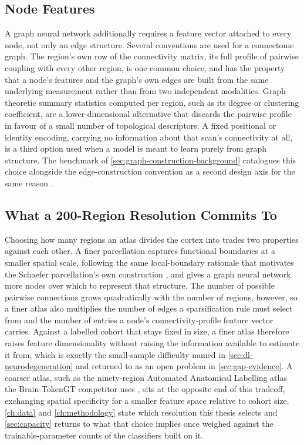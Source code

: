 \subsection{Node Features}\label{sec:node-features-background}

A graph neural network additionally requires a feature vector attached to every node, not
only an edge structure. Several conventions are used for a connectome graph. The
region's own row of the connectivity matrix, its full profile of pairwise coupling with
every other region, is one common choice, and has the property that a node's features and
the graph's own edges are built from the same underlying measurement rather than from two
independent modalities. Graph-theoretic summary statistics computed per region, such as
its degree or clustering coefficient, are a lower-dimensional alternative that discards the
pairwise profile in favour of a small number of topological descriptors. A fixed positional
or identity encoding, carrying no information about that scan's connectivity at all, is a
third option used when a model is meant to learn purely from graph structure. The
benchmark of \autoref{sec:graph-construction-background} catalogues this choice alongside
the edge-construction convention as a second design axis for the same reason
\parencite{cui2023braingb}.

\subsection{What a 200-Region Resolution Commits To}\label{sec:resolution-tradeoff}

Choosing how many regions an atlas divides the cortex into trades two properties against
each other. A finer parcellation captures functional boundaries at a smaller spatial scale,
following the same local-boundary rationale that motivates the Schaefer parcellation's own
construction \parencite{schaefer2018parcellation}, and gives a graph neural network more
nodes over which to represent that structure. The number of possible pairwise connections
grows quadratically with the number of regions, however, so a finer atlas also multiplies
the number of edges a sparsification rule must select from and the number of entries a
node's connectivity-profile feature vector carries. Against a labelled cohort that stays
fixed in size, a finer atlas therefore raises feature dimensionality without raising the
information available to estimate it from, which is exactly the small-sample difficulty
named in \autoref{sec:dl-neurodegeneration} and returned to as an open problem in
\autoref{sec:gap-evidence}. A coarser atlas, such as the ninety-region Automated Anatomical
Labelling atlas the Brain-TokenGT competitor uses \parencite{dong2023braintokengt}, sits at
the opposite end of this tradeoff, exchanging spatial specificity for a smaller feature
space relative to cohort size. \autoref{ch:data} and \autoref{ch:methodology} state which
resolution this thesis selects and \autoref{sec:capacity} returns to what that choice
implies once weighed against the trainable-parameter counts of the classifiers built on it.

